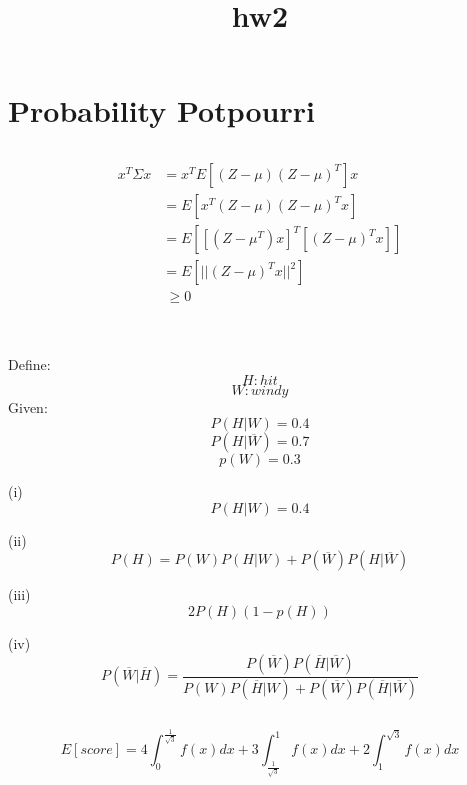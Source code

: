 \documentclass{article}
\title{hw2}
\author{}
\date{}
\begin{document}
\maketitle

\section{}

\section{Probability Potpourri}
\subsection{}

\begin{align*}
x^T{\Sigma}x&=x^TE\left[\left(Z-{\mu}\right)\left(Z-{\mu}\right)^T\right]x \\
&=E\left[x^T\left(Z-{\mu}\right)\left(Z-{\mu}\right)^Tx\right] \\
&=E\left[\left[(Z-{\mu}^T)x\right]^T\left[(Z-{\mu})^Tx\right]\right] \\
&=E\left[||(Z-{\mu})^Tx||^2\right] \\
&\ {\ge}0
\end{align*}
\\

\subsection{}
Define:\\
$$H:hit$$
$$W:windy$$
Given:
$$P(H|W)=0.4$$
$$P(H|\overline{W})=0.7$$
$$p(W)=0.3$$

(i)\\
$$P(H|W)=0.4$$

(ii)\\
$$P(H)=P(W)P(H|W)+P(\overline{W})P(H|\overline{W})$$

(iii)\\
$$2P(H)(1-p(H))$$

(iv)\\
$$
P(\overline{W}|\overline{H})=\frac{P(\overline{W})P(\overline{H}|\overline{W})}{P(W)P(\overline{H}|W)+P(\overline{W})P(\overline{H}|\overline{W})}
$$

\subsection{}
$$E[score]=4\int^{\frac{1}{\sqrt{3}}}_0{f(x)dx}+3\int^1_{\frac{1}{\sqrt{3}}}{f(x)dx}+2\int^{\sqrt{3}}_1{}f(x)dx$$
\end{document}
